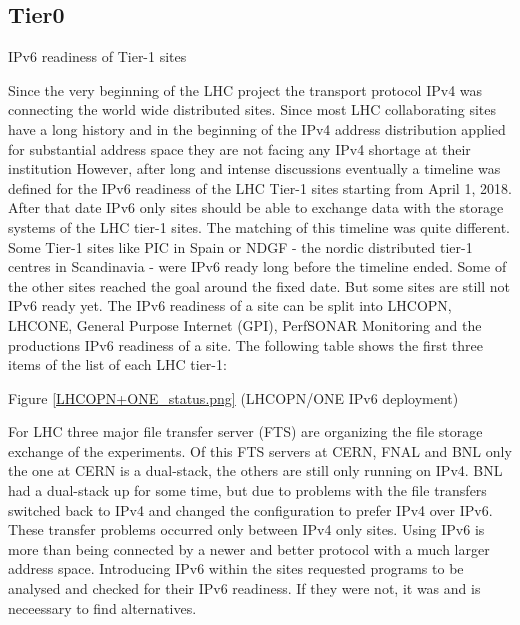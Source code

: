 \subsection{Tier0}

IPv6 readiness of Tier-1 sites
 
Since the very beginning of the LHC project the transport protocol IPv4 was connecting the world wide distributed sites. Since most LHC collaborating sites have a long history and in the beginning of the IPv4 address distribution applied for substantial address space they are not facing any IPv4 shortage at their institution However, after long and intense discussions eventually a timeline was defined for the IPv6 readiness of the LHC Tier-1 sites starting from April 1, 2018. After that date IPv6 only sites should be able to exchange data with the storage systems of the LHC tier-1 sites.  
The matching of this timeline was quite different. Some Tier-1 sites like PIC in Spain or NDGF - the nordic distributed tier-1 centres in Scandinavia - were IPv6 ready long before the timeline ended. Some of the other sites reached the goal around the fixed date. But some sites are still not IPv6 ready yet. The IPv6 readiness of a site can be split into LHCOPN, LHCONE, General Purpose Internet (GPI), PerfSONAR Monitoring and the productions IPv6 readiness of a site. The following table shows the first three items of the list of each LHC tier-1:

Figure \ref{LHCOPN+ONE_status.png} (LHCOPN/ONE IPv6 deployment)

 
For LHC three major file transfer server (FTS) are organizing the file storage exchange of the experiments. Of this FTS servers at CERN, FNAL and BNL only the one at CERN is a dual-stack, the others are still only running on IPv4. BNL had a dual-stack up for some time, but due to problems with the file transfers switched back to IPv4 and changed the configuration to prefer IPv4 over IPv6. These transfer problems occurred only between IPv4 only sites.
Using IPv6 is more than being connected by a newer and better protocol with a much larger address space. Introducing IPv6 within the sites requested programs to be analysed and checked for their IPv6 readiness. If they were not, it was and is neceessary to find alternatives. 

